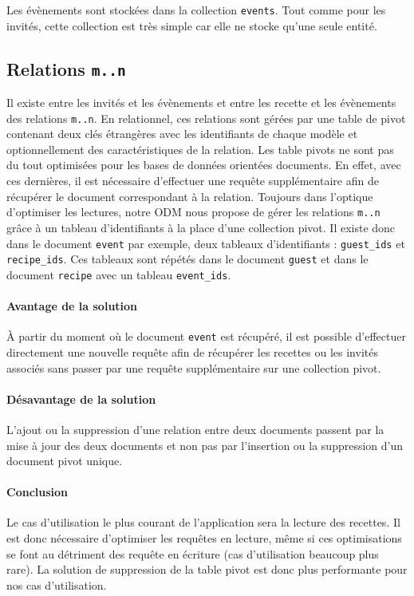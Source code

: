 		Les évènements sont stockées dans la collection \verb|events|. Tout comme pour les invités, cette collection est très simple car elle ne stocke qu'une seule entité.

	\subsection{Relations \texttt{m..n}}

		Il existe entre les invités et les évènements et entre les recette et les évènements des relations \texttt{m..n}. En relationnel, ces relations sont gérées par une table de pivot contenant deux clés étrangères avec les identifiants de chaque modèle et optionnellement des caractéristiques de la relation. Les table pivots ne sont pas du tout optimisées pour les bases de données orientées documents. En effet, avec ces dernières, il est nécessaire d'effectuer une requête supplémentaire afin de récupérer le document correspondant à la relation. Toujours dans l'optique d'optimiser les lectures, notre ODM nous propose de gérer les relations \texttt{m..n} grâce à un tableau d'identifiants à la place d'une collection pivot. Il existe donc dans le document \verb|event| par exemple, deux tableaux d'identifiants : \verb|guest_ids| et \verb|recipe_ids|. Ces tableaux sont répétés dans le document \verb|guest| et dans le document \verb|recipe| avec un tableau \verb|event_ids|.

		\paragraph{Avantage de la solution}%
			À partir du moment où le document \verb|event| est récupéré, il est possible d'effectuer directement une nouvelle requête afin de récupérer les recettes ou les invités associés sans passer par une requête supplémentaire sur une collection pivot.

		\paragraph{Désavantage de la solution}%
			L'ajout ou la suppression d'une relation entre deux documents passent par la mise à jour des deux documents et non pas par l'insertion ou la suppression d'un document pivot unique.

		\paragraph{Conclusion} %
			Le cas d'utilisation le plus courant de l'application sera la lecture des recettes. Il est donc nécessaire d'optimiser les requêtes en lecture, même si ces optimisations se font au détriment des requête en écriture (cas d'utilisation beaucoup plus rare). La solution de suppression de la table pivot est donc plus performante pour nos cas d'utilisation.

